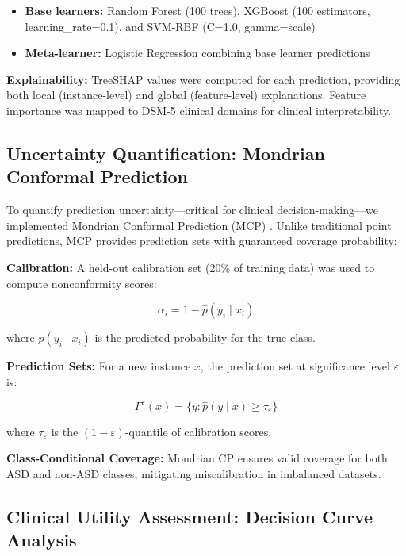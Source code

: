 \documentclass[pdflatex,sn-vancouver-num]{sn-jnl}
\providecommand{\tightlist}{%
  \setlength{\itemsep}{0pt}\setlength{\parskip}{0pt}}
\begin{document}
\begin{itemize}
\tightlist
\item
  \textbf{Base learners:} Random Forest \cite{ref54} (100 trees), XGBoost \cite{ref55} (100 estimators, learning\_rate=0.1), and SVM-RBF (C=1.0, gamma=scale)
\item
  \textbf{Meta-learner:} Logistic Regression combining base learner predictions
\end{itemize}

\textbf{Explainability:} TreeSHAP values were computed for each prediction, providing both local (instance-level) and global (feature-level) explanations. Feature importance was mapped to DSM-5 clinical domains for clinical interpretability.

\subsection{Uncertainty Quantification: Mondrian Conformal Prediction}\label{uncertainty-quantification-mondrian-conformal-prediction}

To quantify prediction uncertainty---critical for clinical decision-making---we implemented Mondrian Conformal Prediction (MCP) \cite{ref56}. Unlike traditional point predictions, MCP provides prediction sets with guaranteed coverage probability:

\textbf{Calibration:} A held-out calibration set (20\% of training data) was used to compute nonconformity scores:

\[
\alpha_i = 1 - \hat{p}(y_i \mid x_i)
\]

where \(\hat{p}(y_i \mid x_i)\) is the predicted probability for the true class.

\textbf{Prediction Sets:} For a new instance \(x\), the prediction set at significance level \(\varepsilon\) is:

\[
\Gamma^\varepsilon(x) = \{y : \hat{p}(y \mid x) \ge \tau_\varepsilon\}
\]

where \(\tau_\varepsilon\) is the \((1-\varepsilon)\)-quantile of calibration scores.

\textbf{Class-Conditional Coverage:} Mondrian CP ensures valid coverage for both ASD and non-ASD classes, mitigating miscalibration in imbalanced datasets.

\subsection{Clinical Utility Assessment: Decision Curve Analysis}\label{clinical-utility-assessment-decision-curve-analysis}
\end{document}
